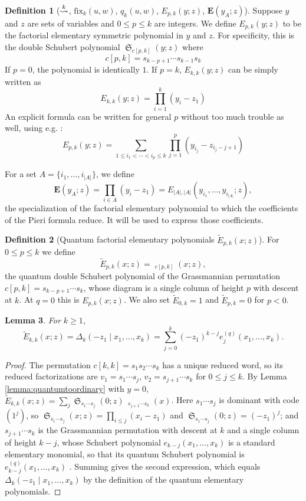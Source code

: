 \documentclass{amsart}
\newtheorem{lemma}{Lemma}[section]
\theoremstyle{definition}
\newtheorem{definition}[lemma]{Definition}
\theoremstyle{remark}
\numberwithin{equation}{section}
\DeclareMathOperator{\sch}{\mathfrak{S}}
\DeclareMathOperator{\qsch}{\widetilde{\mathfrak{S}}}
\newcommand{\xrightsquigarrow}[2][]{%
	\mathrel{\mathop{\rightsquigarrow}\limits^{\scriptstyle #2}%
	\ifx\hfuzz#1\hfuzz\else_{\scriptstyle #1}\fi}%
}
\newcommand{\tom}[1]{\ensuremath{\xrightsquigarrow{#1}}}
\newcommand{\fx}{\mathrm{fix}}
\newcommand{\wte}{\mathbf{E}}
\newcommand{\qelem}{\widetilde{E}}
\begin{document}
\begin{definition}[$\tom{k}$, $\fx_{k}(u,w)$, $q_k(u,w)$, $E_{p,k}(y;z)$, $\wte(y_A;z)$]
Suppose $y$ and $z$ are sets of variables and $0\leq p\leq k$ are integers. We define $E_{p,k}(y;z)$ to be the factorial elementary symmetric polynomial in $y$ and $z$. For specificity, this is the double Schubert polynomial $\sch_{c[p,k]}(y;z)$ where
$$c[p,k] = s_{k-p+1}\cdots s_{k-1}s_k$$
If $p=0$, the polynomial is identically $1$. If $p=k$, $E_{k,k}(y;z)$ can be simply written as
$$E_{k,k}(y;z)=\prod_{i=1}^k(y_i-z_1)$$
An explicit formula can be written for general $p$ without too much trouble as well, using e.g. \cite{molev1999littlewood}:
$$E_{p,k}(y;z)=\sum_{1\leq i_1<\cdots<i_p\leq k}\prod_{j=1}^p(y_{i_j}-z_{i_j-j+1})$$

For a set $A=\{i_1,\ldots,i_{|A|}\}$, we define
$$\wte(y_A;z)=\prod_{i\in A}(y_i-z_1)=E_{|A|,|A|}(y_{i_1},\ldots,y_{i_{|A|}};z),$$
the specialization of the factorial elementary polynomial to which the coefficients of the Pieri formula reduce. It will be used to express those coefficients.
\end{definition}


\begin{definition}[Quantum factorial elementary polynomials $\qelem_{p,k}(x;z)$] \label{def:qelem}
For $0\leq p\leq k$ we define
$$\qelem_{p,k}(x;z)=\qsch_{c[p,k]}(x;z),$$
the quantum double Schubert polynomial of the Grassmannian permutation $c[p,k]=s_{k-p+1}\cdots s_k$, whose diagram is a single column of height $p$ with descent at $k$. At $q=0$ this is $E_{p,k}(x;z)$. We also set $\qelem_{0,k}=1$ and $\qelem_{p,k}=0$ for $p<0$.
\end{definition}

\begin{lemma} \label{lemma:qelemkk}
For $k\geq1$,
$$\qelem_{k,k}(x;z)=\Delta_k(-z_1\mid x_1,\ldots,x_k)=\sum_{j=0}^{k}(-z_1)^{k-j}e_j^{(q)}(x_1,\ldots,x_k).$$
\end{lemma}
\begin{proof}
The permutation $c[k,k]=s_1s_2\cdots s_k$ has a unique reduced word, so its reduced factorizations are $v_1=s_1\cdots s_j$, $v_2=s_{j+1}\cdots s_k$ for $0\leq j\leq k$. By Lemma \ref{lemma:quantumtoordinary} with $y=0$, $\qelem_{k,k}(x;z)=\sum_{j}\sch_{s_1\cdots s_j}(0;z)\,\qsch_{s_{j+1}\cdots s_k}(x)$. Here $s_1\cdots s_j$ is dominant with code $(1^j)$, so $\sch_{s_1\cdots s_j}(x;z)=\prod_{i\leq j}(x_i-z_1)$ and $\sch_{s_1\cdots s_j}(0;z)=(-z_1)^j$; and $s_{j+1}\cdots s_k$ is the Grassmannian permutation with descent at $k$ and a single column of height $k-j$, whose Schubert polynomial $e_{k-j}(x_1,\ldots,x_k)$ is a standard elementary monomial, so that its quantum Schubert polynomial is $e^{(q)}_{k-j}(x_1,\ldots,x_k)$ \cite{fomin1997quantum}. Summing gives the second expression, which equals $\Delta_k(-z_1\mid x_1,\ldots,x_k)$ by the definition of the quantum elementary polynomials.
\end{proof}
\end{document}
